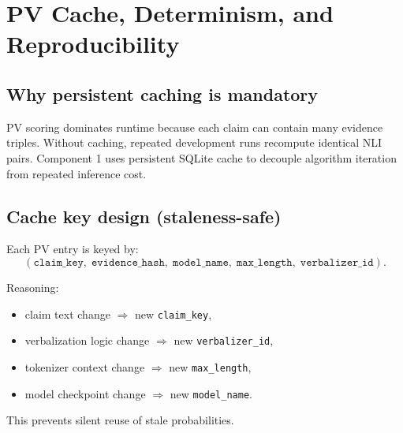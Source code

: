 \section{PV Cache, Determinism, and Reproducibility}
\label{sec:c1_cache}

\subsection{Why persistent caching is mandatory}
PV scoring dominates runtime because each claim can contain many evidence triples.
Without caching, repeated development runs recompute identical NLI pairs.
Component 1 uses persistent SQLite cache to decouple algorithm iteration from repeated inference cost.

\subsection{Cache key design (staleness-safe)}
Each PV entry is keyed by:
\begin{equation}
(\texttt{claim\_key},\;\texttt{evidence\_hash},\;\texttt{model\_name},\;\texttt{max\_length},\;\texttt{verbalizer\_id}).
\end{equation}

Reasoning:
\begin{itemize}
\item claim text change $\Rightarrow$ new \texttt{claim\_key},
\item verbalization logic change $\Rightarrow$ new \texttt{verbalizer\_id},
\item tokenizer context change $\Rightarrow$ new \texttt{max\_length},
\item model checkpoint change $\Rightarrow$ new \texttt{model\_name}.
\end{itemize}
This prevents silent reuse of stale probabilities.

